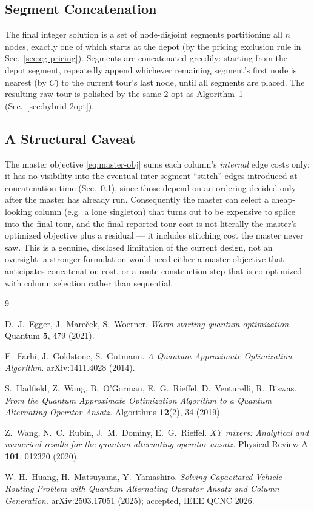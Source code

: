 \documentclass[11pt]{article}
\begin{document}
\subsection{Segment Concatenation}
\label{sec:cg-concat}

The final integer solution is a set of node-disjoint segments partitioning all $n$ nodes, exactly one of which starts at the depot (by the pricing exclusion rule in Sec.~\ref{sec:cg-pricing}). Segments are concatenated greedily: starting from the depot segment, repeatedly append whichever remaining segment's first node is nearest (by $C$) to the current tour's last node, until all segments are placed. The resulting raw tour is polished by the same 2-opt as Algorithm~1 (Sec.~\ref{sec:hybrid-2opt}).

\subsection{A Structural Caveat}
\label{sec:cg-caveat}

The master objective \eqref{eq:master-obj} sums each column's \emph{internal} edge costs only; it has no visibility into the eventual inter-segment ``stitch'' edges introduced at concatenation time (Sec.~\ref{sec:cg-concat}), since those depend on an ordering decided only after the master has already run. Consequently the master can select a cheap-looking column (e.g.\ a lone singleton) that turns out to be expensive to splice into the final tour, and the final reported tour cost is not literally the master's optimized objective plus a residual — it includes stitching cost the master never saw. This is a genuine, disclosed limitation of the current design, not an oversight: a stronger formulation would need either a master objective that anticipates concatenation cost, or a route-construction step that is co-optimized with column selection rather than sequential.


\begin{thebibliography}{9}

D.~J.~Egger, J.~Mareček, S.~Woerner.
\emph{Warm-starting quantum optimization}.
Quantum \textbf{5}, 479 (2021).

E.~Farhi, J.~Goldstone, S.~Gutmann.
\emph{A Quantum Approximate Optimization Algorithm}.
arXiv:1411.4028 (2014).

S.~Hadfield, Z.~Wang, B.~O'Gorman, E.~G.~Rieffel, D.~Venturelli, R.~Biswas.
\emph{From the Quantum Approximate Optimization Algorithm to a Quantum Alternating Operator Ansatz}.
Algorithms \textbf{12}(2), 34 (2019).

Z.~Wang, N.~C.~Rubin, J.~M.~Dominy, E.~G.~Rieffel.
\emph{XY mixers: Analytical and numerical results for the quantum alternating operator ansatz}.
Physical Review A \textbf{101}, 012320 (2020).

W.-H.~Huang, H.~Matsuyama, Y.~Yamashiro.
\emph{Solving Capacitated Vehicle Routing Problem with Quantum Alternating Operator Ansatz and Column Generation}.
arXiv:2503.17051 (2025); accepted, IEEE QCNC 2026.

\end{thebibliography}
\end{document}
